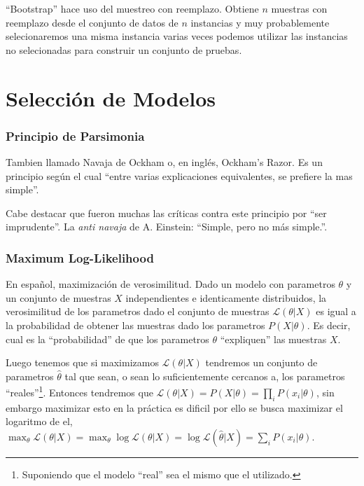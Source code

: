 \documentclass[10pt,a4paper]{article}
\begin{document}
``Bootstrap'' hace uso del muestreo con reemplazo. Obtiene $n$ muestras con reemplazo desde el conjunto de datos de $n$ instancias y muy probablemente selecionaremos una misma instancia varias veces podemos utilizar las instancias no selecionadas para construir un conjunto de pruebas.


\part{Selección de Modelos}
\section{Principio de Parsimonia}
Tambien llamado Navaja de Ockham o, en inglés, Ockham's Razor. Es un principio según el cual ``entre varias explicaciones equivalentes, se prefiere la mas simple''. 

Cabe destacar que fueron muchas las críticas contra este principio por ``ser imprudente''. La \textit{anti navaja} de A. Einstein: ``Simple, pero no más simple.''.

\section{Maximum Log-Likelihood}
En español, maximización de verosimilitud. Dado un modelo con parametros $\theta$ y un conjunto de muestras $X$ independientes e identicamente distribuidos, la verosimilitud de los parametros dado el conjunto de muestras $\mathcal{L}(\theta|X)$ es igual a la probabilidad de obtener las muestras dado los parametros $P(X|\theta)$. Es decir, cual es la ``probabilidad'' de que los parametros $\theta$ ``expliquen'' las muestras $X$.

Luego tenemos que si maximizamos $\mathcal{L}(\theta|X)$ tendremos un conjunto de parametros $\hat{\theta}$ tal que sean, o sean lo suficientemente cercanos a, los parametros ``reales''\footnote{Suponiendo que el modelo ``real'' sea el mismo que el utilizado.}. Entonces tendremos que $\mathcal{L}(\theta|X) = P(X|\theta) = \prod_i P(x_i|\theta)$, sin embargo maximizar esto en la práctica es dificil por ello se busca maximizar el logaritmo de el, $\max_\theta \mathcal{L}(\theta|X) = \max_\theta \log \mathcal{L}(\theta|X) = \log \mathcal{L}(\hat{\theta}|X)= \sum_i P(x_i|\theta)$.

\end{document}

